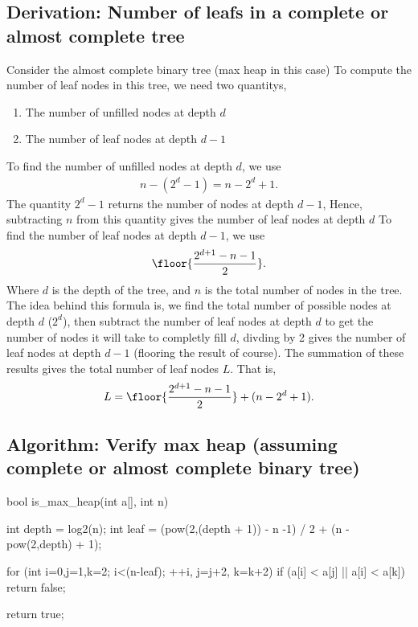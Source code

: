 \documentclass{report}
\begin{document}
    \subsection{Derivation: Number of leafs in a complete or almost complete tree}
    \bigbreak \noindent 
    Consider the almost complete binary tree (max heap in this case)
    \bigbreak \noindent 
    \bigbreak \noindent 
    To compute the number of leaf nodes in this tree, we need two quantitys, 
    \begin{enumerate}
        \item The number of unfilled nodes at depth $d$
        \item The number of leaf nodes at depth $d-1$
    \end{enumerate}
    \bigbreak \noindent 
    To find the number of unfilled nodes at depth $d$, we use
    \begin{align*}
        n - (2^{d} -1) = n-2^{d} + 1
    .\end{align*}
    The quantity $2^{d}-1$ returns the number of nodes at depth $d-1$, Hence, subtracting $n$ from this quantity gives the number of leaf nodes at depth $d$
    \bigbreak \noindent 
    To find the number of leaf nodes at depth $d-1$, we use
    \begin{align*}
        \floor{
            \frac{2^{d+1}-n-1}{2}
        }
    .\end{align*}
    Where $d$ is the depth of the tree, and $n$ is the total number of nodes in the tree. The idea behind this formula is, we find the total number of possible nodes at depth $d$ ($2^{d}$), then subtract the number of leaf nodes at depth $d$ to get the number of nodes it will take to completly fill $d$, divding by 2 gives the number of leaf nodes at depth $d-1$ (flooring the result of course).
    \bigbreak \noindent 
    The summation of these results gives the total number of leaf nodes $L$. That is,
    \begin{align*}
        L = \floor{\frac{2^{d+1}-n-1}{2}} + (n-2^{d}+1)
    .\end{align*}

    \pagebreak 
    \subsection{Algorithm: Verify max heap (assuming complete or almost complete binary tree)}
    \bigbreak \noindent 
    \begin{cppcode}
        bool is_max_heap(int a[], int n) {

            int depth = log2(n);
            int leaf = (pow(2,(depth + 1)) - n -1) / 2 + (n - pow(2,depth) + 1);

            for (int i=0,j=1,k=2; i<(n-leaf); ++i, j=j+2, k=k+2) {
                if (a[i] < a[j] || a[i] < a[k]) {
                    return false;
                }
            }

        }
    return true;
    \end{cppcode}
\end{document}
